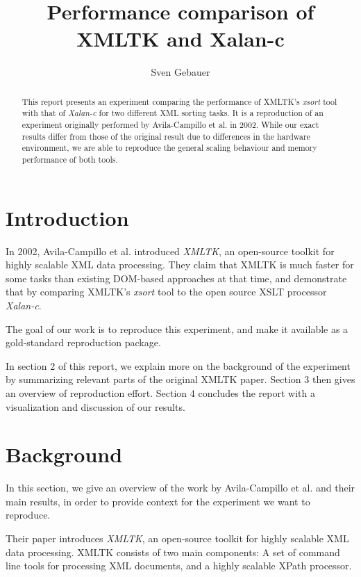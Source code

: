 \documentclass[sigconf,nonacm]{acmart}
\begin{document}
\title{Performance comparison of XMLTK and Xalan-c}
\author{Sven Gebauer}

\begin{abstract}
This report presents an experiment comparing the performance of XMLTK's \emph{xsort} tool with that of \emph{Xalan-c} for two different XML sorting tasks. It is a reproduction of an experiment originally performed by Avila-Campillo et al. in 2002.\cite{XMLTK}  While our exact results differ from those of the original result due to differences in the hardware environment, we are able to reproduce the general scaling behaviour and memory performance of both tools.
\end{abstract}

\maketitle

\section{Introduction}

In 2002, Avila-Campillo et al. introduced \emph{XMLTK}, an open-source toolkit for highly scalable XML data processing.\cite{XMLTK} They claim that XMLTK is much faster for some tasks than existing DOM-based approaches at that time, and demonstrate that by comparing XMLTK's \emph{xsort} tool to the open source XSLT processor \emph{Xalan-c}.\cite{Xalan}

The goal of our work is to reproduce this experiment, and make it available as a gold-standard reproduction package.

In section 2 of this report, we explain more on the background of the experiment by summarizing relevant parts of the original XMLTK paper. Section 3 then gives an overview of reproduction effort. Section 4 concludes the report with a visualization and discussion of our results.

\section{Background}

In this section, we give an overview of the work by Avila-Campillo et al. and their main results, in order to provide context for the experiment we want to reproduce.

Their paper introduces \emph{XMLTK}, an open-source toolkit for highly scalable XML data processing.\cite{XMLTK} XMLTK consists of two main components: A set of command line tools for processing XML documents, and a highly scalable XPath processor.
\end{document}
